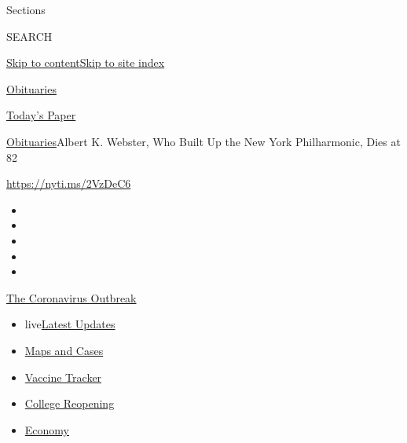 Sections

SEARCH

\protect\hyperlink{site-content}{Skip to
content}\protect\hyperlink{site-index}{Skip to site index}

\href{https://www.nytimes.com/section/obituaries}{Obituaries}

\href{https://myaccount.nytimes.com/auth/login?response_type=cookie\&client_id=vi}{}

\href{https://www.nytimes.com/section/todayspaper}{Today's Paper}

\href{/section/obituaries}{Obituaries}\textbar{}Albert K. Webster, Who
Built Up the New York Philharmonic, Dies at 82

\url{https://nyti.ms/2VzDeC6}

\begin{itemize}
\item
\item
\item
\item
\item
\end{itemize}

\href{https://www.nytimes.com/news-event/coronavirus?action=click\&pgtype=Article\&state=default\&region=TOP_BANNER\&context=storylines_menu}{The
Coronavirus Outbreak}

\begin{itemize}
\tightlist
\item
  live\href{https://www.nytimes.com/2020/08/03/world/coronavirus-covid-19.html?action=click\&pgtype=Article\&state=default\&region=TOP_BANNER\&context=storylines_menu}{Latest
  Updates}
\item
  \href{https://www.nytimes.com/interactive/2020/us/coronavirus-us-cases.html?action=click\&pgtype=Article\&state=default\&region=TOP_BANNER\&context=storylines_menu}{Maps
  and Cases}
\item
  \href{https://www.nytimes.com/interactive/2020/science/coronavirus-vaccine-tracker.html?action=click\&pgtype=Article\&state=default\&region=TOP_BANNER\&context=storylines_menu}{Vaccine
  Tracker}
\item
  \href{https://www.nytimes.com/2020/08/02/us/covid-college-reopening.html?action=click\&pgtype=Article\&state=default\&region=TOP_BANNER\&context=storylines_menu}{College
  Reopening}
\item
  \href{https://www.nytimes.com/live/2020/08/03/business/stock-market-today-coronavirus?action=click\&pgtype=Article\&state=default\&region=TOP_BANNER\&context=storylines_menu}{Economy}
\end{itemize}

